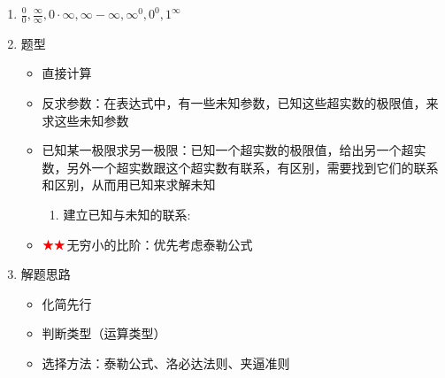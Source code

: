 \documentclass[../book.tex]{subfiles}
\begin{document}
    \begin{enumerate}
        \item $\displaystyle\frac{0}{0}, \frac{\infty}{\infty}, 0\cdot \infty, \infty - \infty, \infty^0, 0^0, 1^\infty$
        \item 题型
        \begin{itemize}
            \item 直接计算
            \item 反求参数：在表达式中，有一些未知参数，已知这些超实数的极限值，来求这些未知参数
            \item 已知某一极限求另一极限：已知一个超实数的极限值，给出另一个超实数，另外一个超实数跟这个超实数有联系，有区别，需要找到它们的联系和区别，从而用已知来求解未知
            \begin{enumerate}
                \item 建立已知与未知的联系:
            \end{enumerate}
            \item $\color{red}{\bigstar\bigstar}$无穷小的比阶：优先考虑泰勒公式
        \end{itemize}
        \item 解题思路
        \begin{itemize}
            \item 化简先行
            \item 判断类型（运算类型）
            \item 选择方法：泰勒公式、洛必达法则、夹逼准则

\end{itemize}
\end{enumerate}
\end{document}
